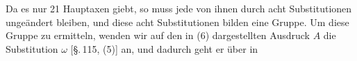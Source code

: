 Da es nur 21 Hauptaxen giebt, so muss jede von ihnen durch acht Substitutionen unge\"andert bleiben, und diese acht Substitutionen bilden eine Gruppe. Um diese Gruppe zu ermitteln, wenden wir auf den in (6) dargestellten Ausdruck $A$ die Substitution $\omega$ [\S.\,115, (5)] an, und dadurch geht er \"uber in

